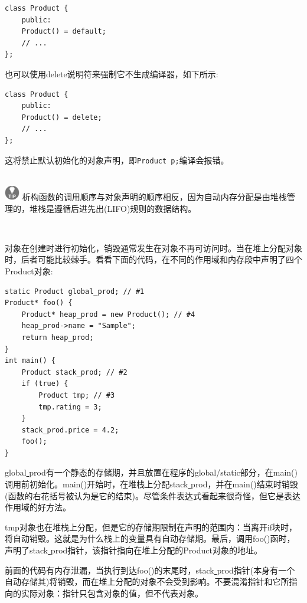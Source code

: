 \begin{lstlisting}[caption={}]
class Product {
	public:
	Product() = default;
	// ...
};
\end{lstlisting}

也可以使用delete说明符来强制它不生成编译器，如下所示:\par

\begin{lstlisting}[caption={}]
class Product {
	public:
	Product() = delete;
	// ...
};
\end{lstlisting}

这将禁止默认初始化的对象声明，即\texttt{Product p;}编译会报错。 \par

\hspace*{\fill} \\ %
\includegraphics[width=0.05\textwidth]{images/tip}
析构函数的调用顺序与对象声明的顺序相反，因为自动内存分配是由堆栈管理的，堆栈是遵循后进先出(LIFO)规则的数据结构。 \par
\noindent\textbf{}\ \par

对象在创建时进行初始化，销毁通常发生在对象不再可访问时。当在堆上分配对象时，后者可能比较棘手。看看下面的代码，在不同的作用域和内存段中声明了四个Product对象: \par

\begin{lstlisting}[caption={}]
static Product global_prod; // #1
Product* foo() {
	Product* heap_prod = new Product(); // #4
	heap_prod->name = "Sample";
	return heap_prod;
}
int main() {
	Product stack_prod; // #2
	if (true) {
		Product tmp; // #3
		tmp.rating = 3;
	}
	stack_prod.price = 4.2;
	foo();
}
\end{lstlisting}

global\underline{ }prod有一个静态的存储期，并且放置在程序的global/static部分，在main()调用前初始化。main()开始时，在堆栈上分配stack\underline{ }prod，并在main()结束时销毁(函数的右花括号被认为是它的结束)。尽管条件表达式看起来很奇怪，但它是表达作用域的好方法。\par
tmp对象也在堆栈上分配，但是它的存储期限制在声明的范围内：当离开if块时，将自动销毁。这就是为什么栈上的变量具有自动存储期。最后，调用foo()函时，声明了stack\underline{ }prod指针，该指针指向在堆上分配的Product对象的地址。 \par
前面的代码有内存泄漏，当执行到达foo()的末尾时，stack\underline{ }prod指针(本身有一个自动存储其)将销毁，而在堆上分配的对象不会受到影响。不要混淆指针和它所指向的实际对象：指针只包含对象的值，但不代表对象。 \par

